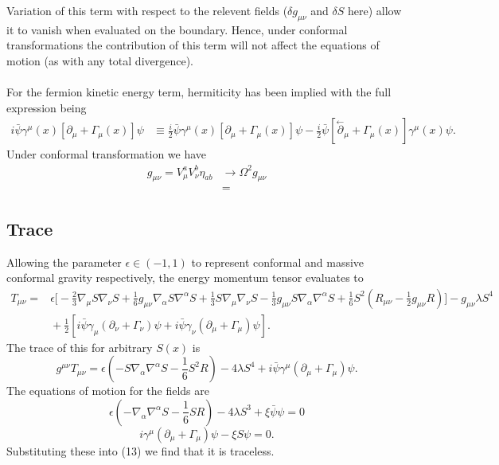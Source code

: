 \documentclass[10pt,letterpaper]{article}
\numberwithin{equation}{subsection}
\begin{document}
Variation of this term with respect to the relevent fields ($\delta g_{\mu\nu}$ and $\delta S$ here) allow it to vanish when evaluated on the boundary. Hence, under conformal transformations the contribution of this term will not affect the equations of motion (as with any total divergence). 
\\ \\
\noindent
For the fermion kinetic energy term, hermiticity has been implied with the full expression being
\begin{align}
i\bar\psi \gamma^\mu(x)[\partial_\mu+ \Gamma_\mu(x)]\psi &\equiv \frac{i}{2} \bar \psi\gamma^\mu(x)[\partial_\mu + \Gamma_{\mu}(x)]\psi - \frac{i}{2}
\bar\psi[\overset{\leftarrow}\partial_\mu +\Gamma_\mu(x)]\gamma^\mu(x)\psi.
\end{align}
Under conformal transformation we have 
\begin{align}
g_{\mu\nu} = V^{a}_\mu V^b_\nu \eta_{ab} &\to \Omega^2 g_{\mu\nu}
\nonumber\\
&= 
\end{align}
\subsection{Trace}
Allowing the parameter $\epsilon \in (-1,1)$ to represent conformal and massive conformal gravity respectively, the energy momentum tensor evaluates to
\begin{align}
	T_{\mu\nu} =&{}
	 \epsilon\bigg[ -\frac23 \nabla_\mu S\nabla_\nu S + \frac16 g_{\mu\nu} \nabla_\alpha S\nabla^\alpha S + \frac13
	S \nabla_\mu \nabla_\nu S -\frac13 g_{\mu\nu} S\nabla_\alpha\nabla^\alpha S+ \frac16 S^2\left( R_{\mu\nu} - \frac12 g_{\mu\nu}R\right)\bigg] - g_{\mu\nu}\lambda S^4
\nonumber\\
&{} +\frac12 \left[ i\bar\psi \gamma_\mu(\partial_\nu +\Gamma_\nu)\psi +  i\bar\psi \gamma_\nu(\partial_\mu +\Gamma_\mu)\psi\right].
\end{align}
The trace of this for arbitrary $S(x)$ is
\begin{equation}
	g^{\mu\nu} T_{\mu\nu} = \epsilon\left( - S \nabla_\alpha \nabla^\alpha S - \frac16 S^2 R\right) - 4\lambda S^4 + i \bar\psi \gamma^\mu(\partial_\mu
	+\Gamma_\mu)\psi.
\end{equation}
The equations of motion for the fields are
\begin{equation}
	\epsilon\left( -\nabla_\alpha \nabla^\alpha S -\frac16 S R\right) - 4\lambda S^3 + \xi \bar\psi\psi = 0
\end{equation}
\begin{equation}
i\gamma^\mu(\partial_\mu +\Gamma_\mu)\psi - \xi S\psi = 0.
\end{equation}
Substituting these into (13) we find that it is traceless.
\end{document}
